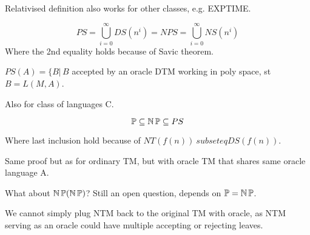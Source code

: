 \begin{note}
	Relativised definition also works for other classes, e.g. EXPTIME.
\end{note}

\begin{definition}
	\[ PS = \bigcup_{i = 0}^{\infty} DS(n^i) = NPS = \bigcup_{i = 0}^{\infty} NS(n^i) \]
	Where the 2nd equality holds because of Savic theorem.
\end{definition}

\begin{definition}
	$PS(A) = \{ B | \, B$ accepted by an oracle DTM working in poly space, st $B = L(M, A)$.

	Also for class of languages C.
\end{definition}

\begin{note}
	\[ \operatorname{\mathbb{P}} \subseteq \operatorname{\operatorname{\mathbb{N}}\mathbb{P}} \subseteq PS \]

	Where last inclusion hold because of $NT(f(n)) \ subseteq DS(f(n))$.

	Same proof but as for ordinary TM, but with oracle TM that shares same oracle language A.
\end{note}

\begin{observation}
	What about $\operatorname{\operatorname{\mathbb{N}}\mathbb{P}}(\operatorname{\operatorname{\mathbb{N}}\mathbb{P}})$? Still an open question, depends on $\operatorname{\mathbb{P}} = \operatorname{\operatorname{\mathbb{N}}\mathbb{P}}$.

	We cannot simply plug NTM back to the original TM with oracle, as NTM serving as an oracle could have multiple accepting or rejecting leaves.
\end{observation}

